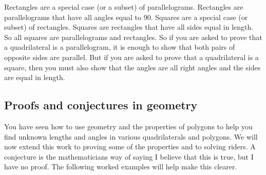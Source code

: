 Rectangles are a special case (or a subset) of parallelograms. Rectangles are
parallelograms that have all angles equal to 90. Squares are a special case (or
subset) of rectangles. Squares are rectangles that have all sides equal in
length. So all squares are parallelograms and rectangles. So if you are asked to
prove that a quadrilateral is a parallelogram, it is enough to show that both
pairs of opposite sides are parallel. But if you are asked to prove that a
quadrilateral is a square, then you must also show that the angles are all right
angles and the sides are equal in length.
\par 

%     

\subsection{ Proofs and conjectures in geometry}

You have seen how to use geometry and the properties of polygons to help you
find unknown lengths and angles in various quadrilaterals and polygons. We will
now extend this work to proving some of the properties and to solving riders. A
conjecture is the mathematicians way of saying I believe that this is true, but
I have no proof. The following worked examples will help make this clearer. 
\par 

